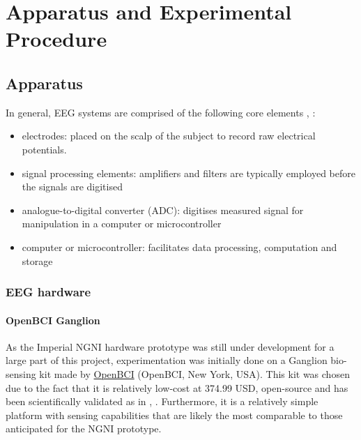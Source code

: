 \chapter{Apparatus and Experimental Procedure}
\label{chapter:experimental-procedure}

\graphicspath{ {report/C4 Experimental Procedure/assets/} } 

\section{Apparatus}

In general, EEG systems are comprised of the following core elements \cite{teplan-eeg-measurement}, \cite{bci-survey-nicolas-alonso}:
\begin{itemize}
    \item electrodes: placed on the scalp of the subject to record raw electrical potentials. 
    \item signal processing elements: amplifiers and filters are typically employed before the signals are digitised
    \item analogue-to-digital converter (ADC): digitises measured signal for manipulation in a computer or microcontroller
    \item computer or microcontroller: facilitates data processing, computation and storage
\end{itemize}

\subsection{EEG hardware}
\subsubsection{OpenBCI Ganglion}
As the Imperial NGNI hardware prototype was still under development for a large part of this project, experimentation was initially done on a Ganglion bio-sensing kit made by \href{https://shop.openbci.com/products/ganglion-board?variant=13461804483}{OpenBCI} (OpenBCI, New York, USA). This kit was chosen due to the fact that it is relatively low-cost at 374.99 USD, open-source and has been scientifically validated as in \cite{autthasan-single-chan-ssvep}, \cite{peterson-bci-survey}. Furthermore, it is a relatively simple platform with sensing capabilities that are likely the most comparable to those anticipated for the NGNI prototype.

